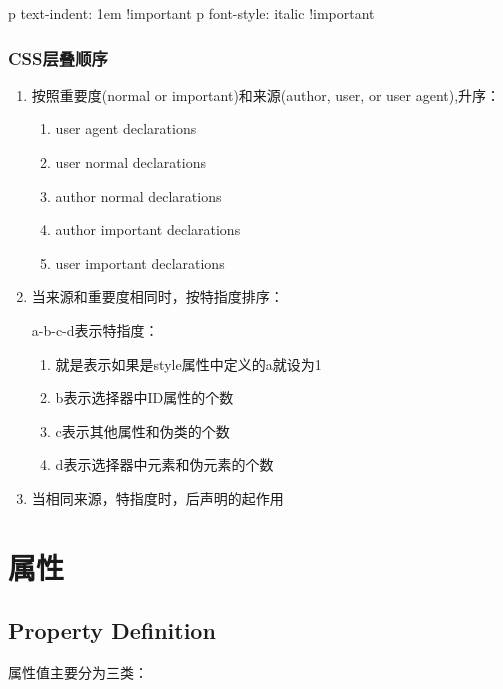 \begin{CSS}
p { text-indent: 1em !important }
p { font-style: italic !important }
\end{CSS}

\subsubsection{CSS层叠顺序}
\begin{enumerate}
\item 按照重要度(normal or important)和来源(author, user, or user agent),升序：
\begin{enumerate}
\item user agent declarations
\item user normal declarations
\item author normal declarations
\item author important declarations
\item user important declarations
\end{enumerate}
\item 当来源和重要度相同时，按特指度排序：

a-b-c-d表示特指度：
\begin{enumerate}
\item 就是表示如果是style属性中定义的a就设为1
\item b表示选择器中ID属性的个数
\item c表示其他属性和伪类的个数
\item d表示选择器中元素和伪元素的个数
\end{enumerate}
\item 当相同来源，特指度时，后声明的起作用
\end{enumerate}

\section{属性}

\subsection{Property Definition}



属性值主要分为三类：

